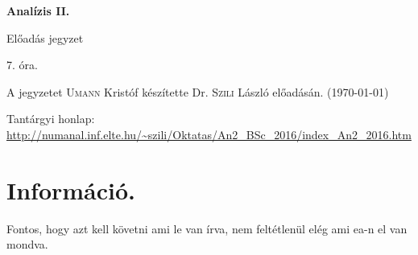\documentclass[a4paper,11.5pt]{article}
\begin{document}
	\setlength\parindent{0pt}
	\def\s{\hspace{0.2mm}\vphantom{\beta}}
	\def\Z{\mathbb{Z}}
	\def\Q{\mathbb{Q}}
	\def\R{\mathbb{R}}
	\def\C{\mathbb{C}}
	\def\N{\mathbb{N}}
	\def\Ra{\overline{\mathbb{R}}}
	
	\def\sume{\displaystyle\sum_{n=1}^{+\infty}}
	\def\sumn{\displaystyle\sum_{n=0}^{+\infty}}
	
	\def\narrow{\underset{n\rightarrow+\infty}{\longrightarrow}}
	\def\limn{\displaystyle\lim_{n\to +\infty}}
	\def\limx{\displaystyle\lim_{x\to +\infty}}
	
	
	\theoremstyle{definition}
	\newtheorem{theorem}{Tétel}[subsection] 
	
	\theoremstyle{definition}
	\newtheorem{definition}[theorem]{Definíció} 
	\newtheorem{example}[theorem]{Példa} 
	\newtheorem{task}[theorem]{Feladat} 
	\newtheorem{note}[theorem]{Megjegyzés}
	\newtheorem{revision}[theorem]{Emlékeztető}
	\begin{center}
		{\LARGE\textbf{Analízis II.}}
		
		{\Large Előadás jegyzet}
		
		7. óra.
	\end{center}
	A jegyzetet \textsc{Umann} Kristóf készítette Dr. \textsc{Szili} László  előadásán. (\today)
	
	
	Tantárgyi honlap: \url{http://numanal.inf.elte.hu/~szili/Oktatas/An2_BSc_2016/index_An2_2016.htm}
	
	\section{Információ.}
	Fontos, hogy azt kell követni ami le van írva, nem feltétlenül elég ami ea-n el van mondva.
\end{document}
